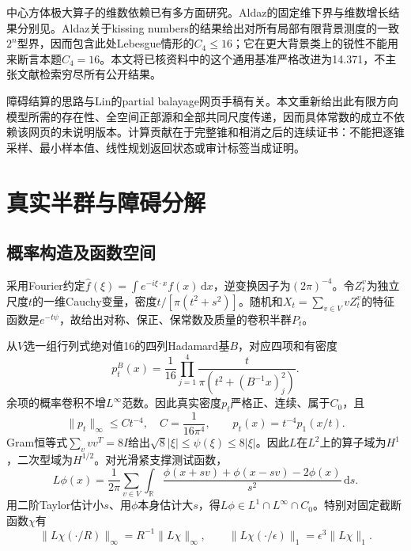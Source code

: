 \documentclass[UTF8,11pt,a4paper,fontset=fandol]{ctexart}
\theoremstyle{remark}\newtheorem{remark}[theorem]{注}
\newcommand{\R}{\mathbb R}\newcommand{\dd}{\,\mathrm d}
\newcommand{\1}{\mathbf1}\newcommand{\pos}[1]{(#1)_+}
\begin{document}
中心方体极大算子的维数依赖已有多方面研究。Aldaz的固定维下界与维数增长结果分别见\cite{Aldaz2000,Aldaz2011}。Aldaz关于kissing numbers的结果\cite{AldazKissing2020}给出对所有局部有限背景测度的一致$2^n$型界，因而包含此处Lebesgue情形的$C_4\le16$；它在更大背景类上的锐性不能用来断言本题$C_4=16$。本文将已核资料中的这个通用基准严格改进为14.371，不主张文献检索穷尽所有公开结果。

障碍结算的思路与Lin的partial balayage网页手稿\cite{LinPartialBalayage}有关。本文重新给出此有限方向模型所需的存在性、全空间正部源和全部共同尺度传递，因而具体常数的成立不依赖该网页的未说明版本。计算贡献在于完整锥和相消之后的连续证书：不能把逐锥采样、最小样本值、线性规划返回状态或审计标签当成证明。

\section{真实半群与障碍分解}
\subsection{概率构造及函数空间}
采用Fourier约定$\widehat f(\xi)=\int e^{-i\xi\cdot x}f(x)\dd x$，逆变换因子为$(2\pi)^{-4}$。令$Z_t^v$为独立尺度$t$的一维Cauchy变量，密度$t/[\pi(t^2+s^2)]$。随机和$X_t=\sum_{v\in V}vZ_t^v$的特征函数是$e^{-t\psi}$，故给出对称、保正、保常数及质量的卷积半群$P_t$。

从$V$选一组行列式绝对值16的四列Hadamard基$B$，对应四项和有密度
\[
 p_t^B(x)=\frac1{16}\prod_{j=1}^4\frac{t}{\pi(t^2+(B^{-1}x)_j^2)}.
\]
余项的概率卷积不增$L^\infty$范数。因此真实密度$p_t$严格正、连续、属于$C_0$，且
\begin{equation}\label{eq:heatbound}
 \|p_t\|_\infty\le C t^{-4},\quad C=\frac1{16\pi^4},\qquad p_t(x)=t^{-4}p_1(x/t).
\end{equation}
Gram恒等式$\sum_v vv^T=8I$给出$\sqrt8|\xi|\le\psi(\xi)\le8|\xi|$。因此$L$在$L^2$上的算子域为$H^1$，二次型域为$H^{1/2}$。对光滑紧支撑测试函数，
\begin{equation}\label{eq:generator}
 L\phi(x)=\frac1{2\pi}\sum_{v\in V}\int_\R
 \frac{\phi(x+sv)+\phi(x-sv)-2\phi(x)}{s^2}\dd s.
\end{equation}
用二阶Taylor估计小$s$、用$\phi$本身估计大$s$，得$L\phi\in L^1\cap L^\infty\cap C_0$。特别对固定截断函数$\chi$有
\begin{equation}\label{eq:cutoff}
 \|L\chi(\cdot/R)\|_\infty=R^{-1}\|L\chi\|_\infty,
 \qquad \|L\chi(\cdot/\epsilon)\|_1=\epsilon^3\|L\chi\|_1.
\end{equation}
\end{document}
